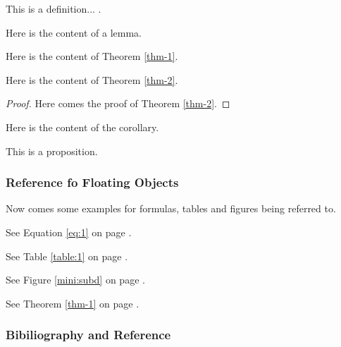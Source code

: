 \documentclass[English]{APSart}
\begin{document}
\begin{definition} %
This is a definition... .
\end{definition}%
\begin{lemma}%
Here is the content of a lemma.
\end{lemma}
\begin{theorem}\label{thm-1}%
Here is the content of Theorem \ref{thm-1}.
\end{theorem}%
\begin{theorem}\label{thm-2}{}\;
	Here is the content of Theorem \ref{thm-2}.
\end{theorem}%
\begin{proof}%
Here comes the proof of Theorem \ref{thm-2}.
\end{proof}
\begin{corollary}%
Here is the content of the corollary.
\end{corollary}
\begin{proposition}
This is a proposition.
\end{proposition}

\subsubsection{Reference fo Floating Objects}
Now comes some examples for formulas, tables and figures being referred to.
\begin{example}
See Equation \eqref{eq:1} on page \pageref{eq:1}.
\end{example}
\begin{example}
See Table \ref{table:1}  on page \pageref{table:1}.
\end{example}
\begin{example}
See Figure \ref{mini:subd} on page \pageref{mini:subd}.
\end{example}
\begin{example}
See Theorem \ref{thm-1} on page \pageref{thm-1}.
\end{example}
		
\subsubsection{Bibiliography and Reference}
	
\end{document}
